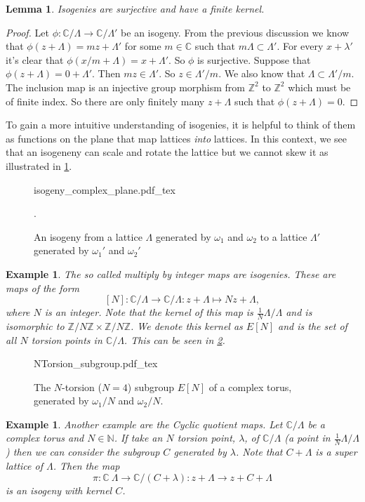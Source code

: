 \documentclass[a4paper]{article}
\newcommand{\incfig}[1]{%
	\def\svgwidth{\columnwidth}
	{#1.pdf_tex}
}
\theoremstyle{theoremdd}
\newtheorem{lemma}[theorem]{Lemma}
\theoremstyle{definitiondd}
\theoremstyle{remarkdd}
\newtheorem{example}[theorem]{Example}
\newcommand{\N}{\mathbb{N}}
\newcommand{\Z}{\mathbb{Z}}
\newcommand{\C}{\mathbb{C}}
\begin{document}
\begin{lemma}
	Isogenies are surjective and have a finite kernel. 
\end{lemma}
\begin{proof}
	Let $\phi: \C / \Lambda \to \C / \Lambda'$ be an isogeny. 
	From the previous discussion we know that $\phi(z+\Lambda) = mz + \Lambda'$ for some $m \in\C$ such that $m \Lambda \subset  \Lambda'$. 
	For every  $x + \lambda'$ it's clear that  $\phi( x / m + \Lambda) = x + \Lambda'$. 
	So  $\phi$ is surjective. 
	Suppose that $\phi(z + \Lambda) = 0 + \Lambda'$. Then  $m z \in \Lambda'$. So  $z \in  \Lambda'/m$. 
	We also know that  $\Lambda \subset \Lambda' / m$. 
	The inclusion map is an injective group morphism from $\Z^2$ to  $\Z^2$ which must be of finite index. 
	So there are only finitely many $z + \Lambda$ such that  $\phi(z + \Lambda) = 0$.
\end{proof}
To gain a more intuitive understanding of isogenies, it is helpful to think of them as functions on the plane that map lattices \emph{into} lattices.
In this context, we see that an isogeneny can scale and rotate the lattice but we cannot skew it as illustrated in \cref{fig:isogeny}.
\begin{figure}[h]
	\centering
\incfig{isogeny_complex_plane}
\caption{An isogeny from a lattice $\Lambda$ generated by $\omega_1$ and $\omega_2$ to a lattice $\Lambda'$ generated by $\omega_1'$ and $\omega_2'$}.
\label{fig:isogeny}
\end{figure}

\begin{example}
	The so called \emph{multiply by integer maps} are isogenies. These are maps of the form \[
		[N]: \C / \Lambda \to \C / \Lambda: z + \Lambda \mapsto  Nz + \Lambda
	,\] where $N$ is an integer. 
	Note that the kernel of this map is $\frac{1}{N}\Lambda / \Lambda$ and is isomorphic to $\Z / N \Z \times  \Z / N \Z$. We denote this kernel as $E[N]$ and is the set of all $N$ torsion points in $\C / \Lambda$. This can be seen in \cref{fig:Ntorsion_subgroup}.
\end{example}
	\begin{figure}[h]
		\incfig{NTorsion_subgroup}	
		\caption{The $N$-torsion ($N = 4$) subgroup $E[N]$ of a complex torus, generated by  $\omega_1 / N$ and $\omega_2 / N$.}
		\label{fig:Ntorsion_subgroup}
	\end{figure}
\begin{example}
	Another example are the \emph{Cyclic quotient maps}. 
	Let  $\C / \Lambda$ be a complex torus and  $N \in \N$.
	If take an $N$ torsion point, $\lambda$, of $\C / \Lambda$ (a point in $\frac{1}{N} \Lambda / \Lambda$) then we can consider the subgroup $C$ generated by $\lambda$. Note that $C + \Lambda$ is a super lattice of $\Lambda$. Then the map \[
		\pi: \C \ \Lambda \to \C / (C + \lambda): z + \Lambda \to z + C + \Lambda
	\]  
	is an isogeny with kernel $C$. 
\end{example}
\end{document}
